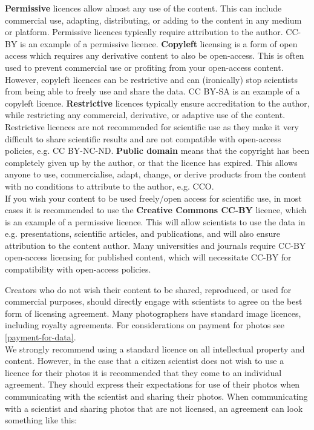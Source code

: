 \documentclass{article}
\begin{document}
\textbf{Permissive} licences allow almost any use of the content. This can include commercial use, adapting, distributing, or adding to the content in any medium or platform. Permissive licences typically require attribution to the author. CC-BY is an example of a permissive licence.
\textbf{Copyleft} licensing is a form of open access which requires any derivative content to also be open-access. This is often used to prevent commercial use or profiting from your open-access content. However, copyleft licences can be restrictive and can (ironically) stop scientists from being able to freely use and share the data. CC BY-SA is an example of a copyleft licence.
\textbf{Restrictive} licences typically ensure accreditation to the author, while restricting any commercial, derivative, or adaptive use of the content. Restrictive licences are not recommended for scientific use as they make it very difficult to share scientific results and are not compatible with open-access policies, e.g. CC BY-NC-ND.
\textbf{Public domain} means that the copyright has been completely given up by the author, or that the licence has expired. This allows anyone to use, commercialise, adapt, change, or derive products from the content with no conditions to attribute to the author, e.g. CCO. \\

If you wish your content to be used freely/open access for scientific use, in most cases it is recommended to use the \textbf{Creative Commons CC-BY} licence, which is an example of a permissive licence. This will allow scientists to use the data in e.g. presentations, scientific articles, and publications, and will also ensure attribution to the content author. Many universities and journals require CC-BY open-access licensing for published content, which will necessitate CC-BY for compatibility with open-access policies.

Creators who do not wish their content to be shared, reproduced, or used for commercial purposes, should directly engage with scientists to agree on the best form of licensing agreement. Many photographers have standard image licences, including royalty agreements. For considerations on payment for photos see \ref{payment-for-data}. \\

We strongly recommend using a standard licence on all intellectual property and content. However, in the case that a citizen scientist does not wish to use a licence for their photos it is recommended that they come to an individual agreement. They should express their expectations for use of their photos when communicating with the scientist and sharing their photos. When communicating with a scientist and sharing photos that are not licensed, an agreement can look something like this:
\end{document}
